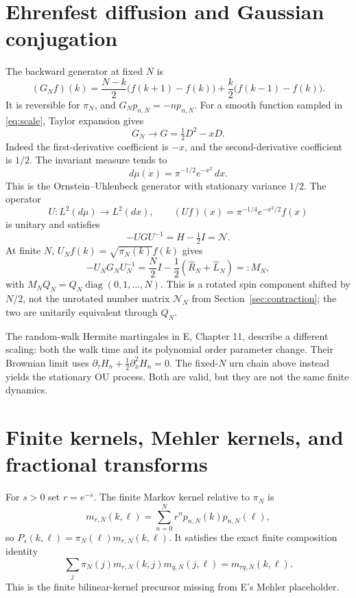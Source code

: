 \documentclass[11pt,reqno]{amsart}
\theoremstyle{remark}\newtheorem{remark}[proposition]{Remark}
\newcommand{\Id}{I}\newcommand{\NN}{\mathcal N}
\DeclareMathOperator{\diag}{diag}
\begin{document}
\section{Ehrenfest diffusion and Gaussian conjugation}\label{sec:diffusion}
The backward generator at fixed $N$ is
\begin{equation}\label{eq:GN}
 (G_Nf)(k)=\frac{N-k}{2}\big(f(k+1)-f(k)\big)
          +\frac k2\big(f(k-1)-f(k)\big).
\end{equation}
It is reversible for $\pi_N$, and $G_Np_{n,N}=-np_{n,N}$.
For a smooth function sampled in \eqref{eq:scale}, Taylor expansion gives
\[
 G_N\longrightarrow G=\tfrac12D^2-xD.
\]
Indeed the first-derivative coefficient is $-x$, and the second-derivative
coefficient is $1/2$. The invariant measure tends to
\[
 d\mu(x)=\pi^{-1/2}e^{-x^2}\,dx.
\]
This is the Ornstein--Uhlenbeck generator with stationary variance $1/2$.
The operator
\[
 U:L^2(d\mu)\to L^2(dx),\qquad
 (Uf)(x)=\pi^{-1/4}e^{-x^2/2}f(x)
\]
is unitary and satisfies
\begin{equation}\label{eq:OUconjugacy}
 -UGU^{-1}=H-\tfrac12\Id=\NN.
\end{equation}
At finite $N$, $U_Nf(k)=\sqrt{\pi_N(k)}f(k)$ gives
\[
 -U_NG_NU_N^{-1}
 =\frac N2\Id-\frac12(\widehat R_N+\widehat L_N)
 =:M_N,
\]
with $M_NQ_N=Q_N\diag(0,1,\ldots,N)$.
This is a rotated spin component shifted by $N/2$, not the unrotated
number matrix $\NN_N$ from Section~\ref{sec:contraction}; the two are
unitarily equivalent through $Q_N$.

The random-walk Hermite martingales in E, Chapter 11, describe a different
scaling: both the walk time and its polynomial order parameter change.
Their Brownian limit uses
$\partial_\tau H_n+\tfrac12\partial_x^2H_n=0$.
The fixed-$N$ urn chain above instead yields the stationary OU process.
Both are valid, but they are not the same finite dynamics.

\section{Finite kernels, Mehler kernels, and fractional transforms}\label{sec:finite-kernels}
For $s>0$ set $r=e^{-s}$. The finite Markov kernel relative to $\pi_N$ is
\begin{equation}\label{eq:finite-mehler}
 m_{r,N}(k,\ell)=\sum_{n=0}^N r^n p_{n,N}(k)p_{n,N}(\ell),
\end{equation}
so $P_s(k,\ell)=\pi_N(\ell)m_{r,N}(k,\ell)$.
It satisfies the exact finite composition identity
\[
 \sum_j\pi_N(j)m_{r,N}(k,j)m_{q,N}(j,\ell)
 =m_{rq,N}(k,\ell).
\]
This is the finite bilinear-kernel precursor missing from E's Mehler
placeholder.
\end{document}
